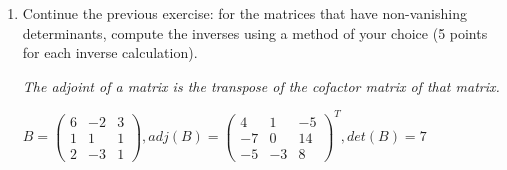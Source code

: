 \documentclass[fleqn]{article}
\begin{document}
\begin{enumerate}
    $
    det(D)=
      (2)(-1)^{1+1}
      \begin{pmatrix}
        -4 & 3 & -1 \\ 
        -1 & 1 & -3 \\ 
        1 & -2 & 4
      \end{pmatrix}
      +
      (3)(-1)^{2+1}
      \begin{pmatrix}
        3 & -1 & 1 \\ 
        -1 & 1 & -3 \\ 
        1 & -2 & 4
      \end{pmatrix}
      +
      (2)(-1)^{3+1}
      \begin{pmatrix}
       3 & -1 & 1 \\ 
       -4 & 3 & -1 \\ 
       1 & -2 & 4
      \end{pmatrix}
      +
      (3)(-1)^{4+1}
      \begin{pmatrix}
       3 & -1 & 1 \\ 
       -4 & 3 & -1 \\ 
       -1 & 1 & -3
      \end{pmatrix}
    $

    $
      = 2[-4(4-6)-3(-4+3)-(2-1)]+(-3)[3(4-6)+(-4+3)+(2-1)]
      + 2[3(12-2)+(-16+1)+(8-3)]+(-3)[3(-9+1)+(12-1)+(-4+3)]
    $

    $
    = 20+18+40+42
  $

    $\Rightarrow$ 
    $
      det(D)= 120
    $

    \emph{Matrix D is invertible.}

    \bigbreak

  \item Continue the previous exercise: for the matrices that have non-vanishing determinants, compute the inverses using a method of your choice (5 points for each inverse calculation). 

    \emph{The adjoint of a matrix is the transpose of the cofactor matrix of that matrix.}
    
    $B=
      \begin{pmatrix}
        6 & -2 & 3 \\ 
        1 & 1 & 1 \\ 
        2 & -3 & 1
      \end{pmatrix}
      ,
      adj(B)=
      \begin{pmatrix}
       4 & 1 & -5 \\
       -7 & 0 & 14 \\
       -5 & -3 & 8
      \end{pmatrix}^T
      ,
      det(B)=7
    $


\end{enumerate}
\end{document}
